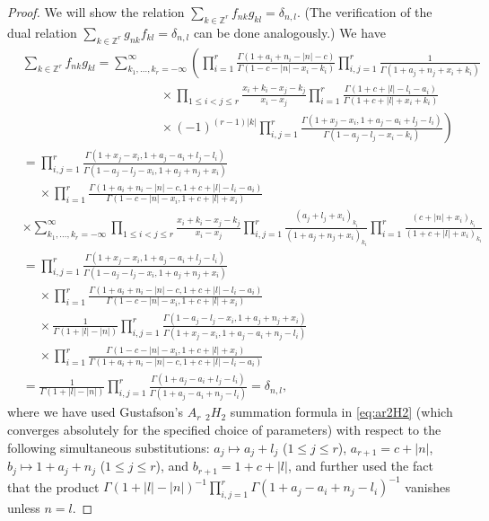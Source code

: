 \documentclass[10pt,a4paper]{amsart}
\newcommand{\Ga}{\Gamma}
\newcommand{\Z}{\mathbb Z}
\begin{document}
\begin{proof}
We will show the relation $\sum_{k\in\Z^r}f_{nk}g_{kl}=\delta_{n,l}$.
(The verification of the dual relation $\sum_{k\in\Z^r}g_{nk}f_{kl}=\delta_{n,l}$
can be done analogously.) We have
\begin{align*}
  &\sum_{k\in\Z^r}f_{nk}g_{kl}
  =\sum_{k_1,\ldots,k_r=-\infty}^\infty
  \left(\prod_{i=1}^r\frac{\Ga(1+a_i+n_i-|n|-c)}{\Ga(1-c-|n|-x_i-k_i)}
\prod_{i,j=1}^r\frac1{\Ga(1+a_j+n_j+x_i+k_i)}\right.\\
&\qquad\qquad\qquad\qquad\qquad\quad\times
\prod_{1\le i<j\le r}\frac{x_i+k_i-x_j-k_j}{x_i-x_j}
\prod_{i=1}^r\frac{\Ga(1+c+|l|-l_i-a_i)}
{\Ga(1+c+|l|+x_i+k_i)}\\
&\left.\qquad\qquad\qquad\qquad\qquad\quad\times
(-1)^{(r-1)|k|}\prod_{i,j=1}^r\frac{\Ga(1+x_j-x_i,1+a_j-a_i+l_j-l_i)}
{\Ga(1-a_j-l_j-x_i-k_i)}\right)\\
&=\prod_{i,j=1}^r\frac{\Ga(1+x_j-x_i,1+a_j-a_i+l_j-l_i)}
{\Ga(1-a_j-l_j-x_i,1+a_j+n_j+x_i)} \\
  &\quad\;\times
    \prod_{i=1}^r
\frac{\Ga(1+a_i+n_i-|n|-c,1+c+|l|-l_i-a_i)}
{\Ga(1-c-|n|-x_i,1+c+|l|+x_i)}\\
&\times
\sum_{k_1,\ldots,k_r=-\infty}^\infty
\prod_{1\le i<j\le r}\!\!\frac{x_i+k_i-x_j-k_j}{x_i-x_j}
  \prod_{i,j=1}^r\frac{(a_j+l_j+x_i)_{k_i}}{(1+a_j+n_j+x_i)_{k_i}}
 \prod_{i=1}^r\frac{(c+|n|+x_i)_{k_i}}{(1+c+|l|+x_i)_{k_i}}\\
 &=\prod_{i,j=1}^r\frac{\Ga(1+x_j-x_i,1+a_j-a_i+l_j-l_i)}
{\Ga(1-a_j-l_j-x_i,1+a_j+n_j+x_i)} \\
&\quad\;\times\prod_{i=1}^r
\frac{\Ga(1+a_i+n_i-|n|-c,1+c+|l|-l_i-a_i)}
{\Ga(1-c-|n|-x_i,1+c+|l|+x_i)}\\
&\quad\;\times\frac 1{\Ga(1+|l|-|n|)}
\prod_{i,j=1}^r\frac{\Ga(1-a_j-l_j-x_i,1+a_j+n_j+x_i)}
{\Ga(1+x_j-x_i,1+a_j-a_i+n_j-l_i)}\\
&\quad\;\times
\prod_{i=1}^r\frac{\Ga(1-c-|n|-x_i,1+c+|l|+x_i)}
{\Ga(1+a_i+n_i-|n|-c,1+c+|l|-l_i-a_i)}\\
&=\frac 1{\Ga(1+|l|-|n|)}
\prod_{i,j=1}^r\frac{\Ga(1+a_j-a_i+l_j-l_i)}
{\Ga(1+a_j-a_i+n_j-l_i)}=\delta_{n,l},
\end{align*}
where we have used Gustafson's $A_r$ $_2H_2$ summation
formula in \eqref{eq:ar2H2} (which converges absolutely for the
specified choice of parameters) with respect to the
following simultaneous substitutions:
$a_j\mapsto a_j+l_j$ ($1\le j\le r$), $a_{r+1}=c+|n|$,
$b_j\mapsto 1+a_j+n_j$ ($1\le j\le r$), and $b_{r+1}=1+c+|l|$,
and further used the fact that the product
$\Ga(1+|l|-|n|)^{-1}\prod_{i,j=1}^r
\Ga(1+a_j-a_i+n_j-l_i)^{-1}$ vanishes unless $n=l$.
\end{proof}
\end{document}
